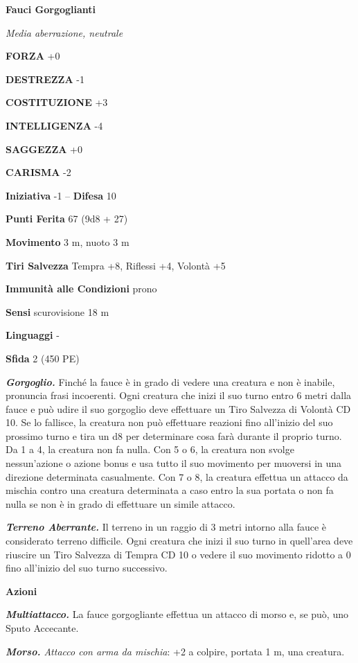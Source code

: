 \begin{multicols}{2}
\medskip{}\textbf{Fauci Gorgoglianti}

\emph{Media aberrazione, neutrale}

\textbf{FORZA} +0

\textbf{DESTREZZA} -1

\textbf{COSTITUZIONE} +3

\textbf{INTELLIGENZA} -4

\textbf{SAGGEZZA} +0

\textbf{CARISMA} -2

\textbf{Iniziativa} -1 -- \textbf{Difesa} 10

\textbf{Punti Ferita} 67 (9d8 + 27)

\textbf{Movimento} 3 m, nuoto 3 m

\textbf{Tiri Salvezza} Tempra +8, Riflessi +4, Volontà +5

\textbf{Immunità alle Condizioni} prono

\textbf{Sensi} scurovisione 18 m

\textbf{Linguaggi} -

\textbf{Sfida} 2 (450 PE)

\emph{\textbf{Gorgoglio.}} Finché la fauce è in grado di vedere una creatura e non è inabile, pronuncia frasi incoerenti. Ogni creatura che inizi il suo turno entro 6 metri dalla fauce e può udire il suo gorgoglio deve effettuare un Tiro Salvezza di Volontà CD 10. Se lo fallisce, la creatura non può effettuare reazioni fino all'inizio del suo prossimo turno e tira un d8 per determinare cosa farà durante il proprio turno. Da 1 a 4, la creatura non fa nulla. Con 5 o 6, la creatura non svolge nessun'azione o azione bonus e usa tutto il suo movimento per muoversi in una direzione determinata casualmente. Con 7 o 8, la creatura effettua un attacco da mischia contro una creatura determinata a caso entro la sua portata o non fa nulla se non è in grado di effettuare un simile attacco.

\emph{\textbf{Terreno Aberrante.}} Il terreno in un raggio di 3 metri intorno alla fauce è considerato terreno difficile. Ogni creatura che inizi il suo turno in quell'area deve riuscire un Tiro Salvezza di Tempra CD 10 o vedere il suo movimento ridotto a 0 fino all'inizio del suo turno successivo.

\textbf{Azioni}

\emph{\textbf{Multiattacco.}} La fauce gorgogliante effettua un attacco di morso e, se può, uno Sputo Accecante.

\emph{\textbf{Morso.} Attacco con arma da mischia}: +2 a colpire, portata 1 m, una creatura.


\end{multicols}
